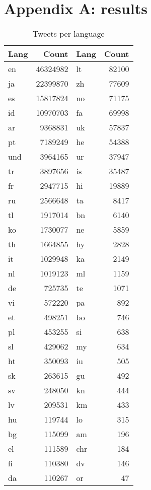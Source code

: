 \documentclass[a4paper,11pt]{article}
\begin{document}
\appendix

\section{Appendix A: results}

\begin{table}
\centering
\begin{tabular}{|l|r||l|r|}
\hline
Lang & Count & Lang & Count \\
\hline
en & 46324982 &             lt & 82100 \\
ja & 22399870 &             zh & 77609 \\
es & 15817824 &             no & 71175 \\
id & 10970703 &             fa & 69998 \\
ar & 9368831 &                      uk & 57837 \\
pt & 7189249 &                      he & 54388 \\
und & 3964165 &             ur & 37947 \\
tr & 3897656 &                      is & 35487 \\
fr & 2947715 &                      hi & 19889 \\
ru & 2566648 &                      ta & 8417 \\
tl & 1917014 &                      bn & 6140 \\
ko & 1730077 &                      ne & 5859 \\
th & 1664855 &                      hy & 2828 \\
it & 1029948 &                      ka & 2149 \\
nl & 1019123 &                      ml & 1159 \\
de & 725735 &                       te & 1071 \\
vi & 572220 &                       pa & 892 \\
et & 498251 &                       bo & 746 \\
pl & 453255 &                       si & 638 \\
sl & 429062 &                       my & 634 \\
ht & 350093 &                       iu & 505 \\
sk & 263615 &                       gu & 492 \\
sv & 248050 &                       kn & 444 \\
lv & 209531 &                       km & 433 \\
hu & 119744 &                       lo & 315 \\
bg & 115099 &                       am & 196 \\
el & 111589 &                       chr & 184 \\
fi & 110380 &                       dv & 146 \\
da & 110267 &                       or & 47 \\
\hline
\end{tabular}
\label{twperlang}
\caption{Tweets per language}
\end{table}
\end{document}
